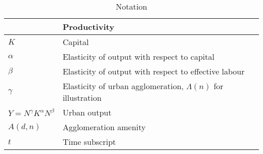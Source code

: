 \newpage
\begin{longtable}{lp{10cm}}
\caption{Notation} \\ \hline

		   &  \textbf{Productivity} \\ \hline
$K$       &  Capital \\
$\alpha$  &  Elasticity of output with respect to capital \\
$\beta$   &  Elasticity of output with respect to effective labour \\
$\gamma$  &  Elasticity of urban agglomeration, $\Lambda(n)$ for illustration \\
$Y=N^\gamma K^{\alpha }N^{\beta }$  &  Urban output \\


$A(d, n)$   &  Agglomeration amenity \\
$t$         &  Time subscript \\ \hline


\end{longtable}
